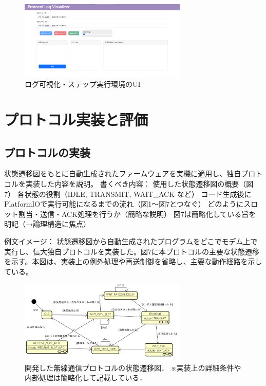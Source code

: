 \documentclass[paper]{ieicej}
\begin{document}
  \begin{figure}[tb]
    \centering
    \includegraphics[width=80mm]{./images/viewer_ui.png}
    \caption{ログ可視化・ステップ実行環境のUI}
    \label{fig:viewer-ui}
  \end{figure}


\section{プロトコル実装と評価}

\subsection{プロトコルの実装}
状態遷移図をもとに自動生成されたファームウェアを実機に適用し、独自プロトコルを実装した内容を説明。
書くべき内容：
使用した状態遷移図の概要（図7）
各状態の役割（IDLE, TRANSMIT, WAIT\_ACK など）
コード生成後にPlatformIOで実行可能になるまでの流れ（図1〜図7とつなぐ）
どのようにスロット割当・送信・ACK処理を行うか（簡略な説明）
図7は簡略化している旨を明記（→論理構造に焦点）

例文イメージ：
状態遷移図から自動生成されたプログラムをどこでモデム上で実行し、信大独自プロトコルを実装した。図7に本プロトコルの主要な状態遷移を示す。本図は、実装上の例外処理や再送制御を省略し、主要な動作経路を示している。
\begin{figure}[tb]
  \centering
  \includegraphics[width=80mm]{./images/protocol-state-machine3.png}
  \caption{開発した無線通信プロトコルの状態遷移図．
※実装上の詳細条件や内部処理は簡略化して記載している．}
  \label{fig:protocol-state-machine}
\end{figure}
\end{document}

